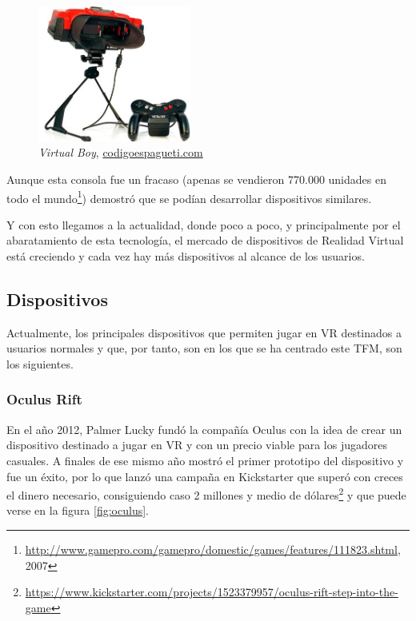 \begin{figure}[H]
    \begin{center}
        \includegraphics[width=0.45\textwidth]{imagenes/2/virtual-boy.jpg}
        \caption{\textit{Virtual Boy}, \url{codigoespagueti.com}}
        \label{fig:virtual-boy}
    \end{center}
\end{figure}

Aunque esta consola fue un fracaso (apenas se vendieron 770.000 unidades en todo el mundo\footnote{\url{http://www.gamepro.com/gamepro/domestic/games/features/111823.shtml}, 2007}) demostró que se podían desarrollar dispositivos similares.

Y con esto llegamos a la actualidad, donde poco a poco, y principalmente por el abaratamiento de esta tecnología, el mercado de dispositivos de Realidad Virtual está creciendo y cada vez hay más dispositivos al alcance de los usuarios.

\subsection{Dispositivos}

Actualmente, los principales dispositivos que permiten jugar en \acs{VR} destinados a usuarios normales y que, por tanto, son en los que se ha centrado este \acs{TFM}, son los siguientes.

\subsubsection{Oculus Rift} 

En el año 2012, Palmer Lucky fundó la compañía Oculus con la idea de crear un dispositivo destinado a jugar en \acs{VR} y con un precio viable para los jugadores casuales. A finales de ese mismo año mostró el primer prototipo del dispositivo y fue un éxito, por lo que lanzó una campaña en Kickstarter que superó con creces el dinero necesario, consiguiendo caso 2 millones y medio de dólares\footnote{\url{https://www.kickstarter.com/projects/1523379957/oculus-rift-step-into-the-game}} y que puede verse en la figura \ref{fig:oculus}.
    
